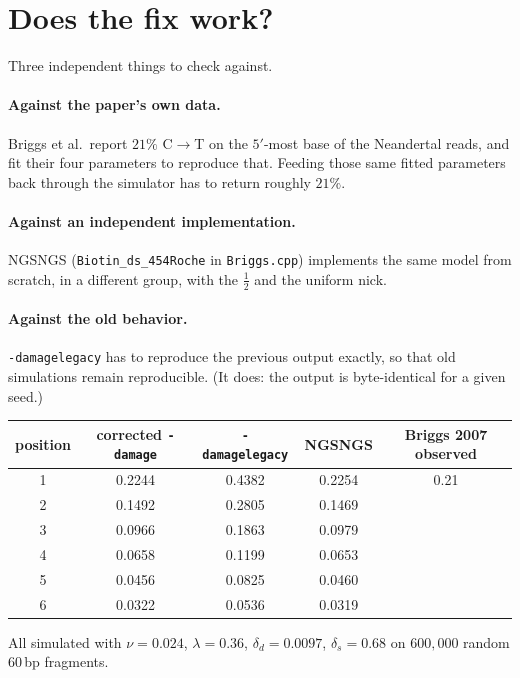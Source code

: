 \documentclass[11pt,a4paper]{article}
\begin{document}
\section{Does the fix work?}

Three independent things to check against.

\paragraph{Against the paper's own data.} Briggs et al.\ report $21\%$ C$\to$T on the
$5'$-most base of the Neandertal reads, and fit their four parameters to reproduce
that. Feeding those same fitted parameters back through the simulator has to return
roughly $21\%$.

\paragraph{Against an independent implementation.} NGSNGS
(\texttt{Biotin\_ds\_454Roche} in \texttt{Briggs.cpp}) implements the same model from
scratch, in a different group, with the $\tfrac12$ and the uniform nick.

\paragraph{Against the old behavior.} \texttt{-damagelegacy} has to reproduce the
previous output exactly, so that old simulations remain reproducible. (It does: the
output is byte-identical for a given seed.)

\begin{center}
\begin{tabular}{ccccc}
\toprule
position & corrected \texttt{-damage} & \texttt{-damagelegacy} & NGSNGS & Briggs 2007 observed \\
\midrule
1 & 0.2244 & 0.4382 & 0.2254 & 0.21 \\
2 & 0.1492 & 0.2805 & 0.1469 & \\
3 & 0.0966 & 0.1863 & 0.0979 & \\
4 & 0.0658 & 0.1199 & 0.0653 & \\
5 & 0.0456 & 0.0825 & 0.0460 & \\
6 & 0.0322 & 0.0536 & 0.0319 & \\
\bottomrule
\end{tabular}
\end{center}

\noindent
All simulated with $\nu = 0.024$, $\lambda = 0.36$, $\delta_d = 0.0097$,
$\delta_s = 0.68$ on $600{,}000$ random $60$\,bp fragments.
\end{document}
